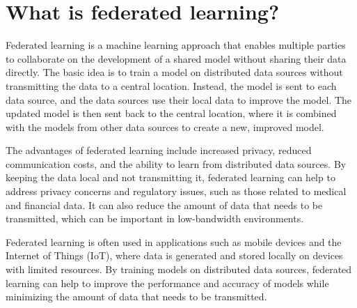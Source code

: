 \section{What is federated learning?}
Federated learning is a machine learning approach that enables multiple parties to collaborate on the development of a shared model without sharing their data directly. The basic idea is to train a model on distributed data sources without transmitting the data to a central location. Instead, the model is sent to each data source, and the data sources use their local data to improve the model. The updated model is then sent back to the central location, where it is combined with the models from other data sources to create a new, improved model.

The advantages of federated learning include increased privacy, reduced communication costs, and the ability to learn from distributed data sources. By keeping the data local and not transmitting it, federated learning can help to address privacy concerns and regulatory issues, such as those related to medical and financial data. It can also reduce the amount of data that needs to be transmitted, which can be important in low-bandwidth environments.

Federated learning is often used in applications such as mobile devices and the Internet of Things (IoT), where data is generated and stored locally on devices with limited resources. By training models on distributed data sources, federated learning can help to improve the performance and accuracy of models while minimizing the amount of data that needs to be transmitted.

